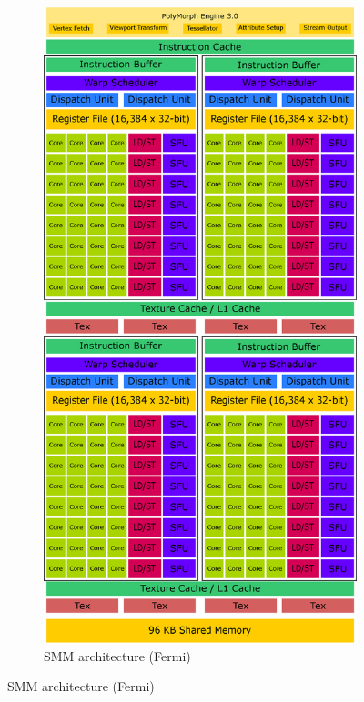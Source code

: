 \begin{figure}[p]
\begin{subfigure}{0.5\textwidth}
  \includegraphics[width=1\linewidth]{img/SMMArchitecture.eps}
  \caption{SMM architecture (Fermi)}
  \label{fig:smmarchitecture}
\end{subfigure}%
\vspace*{0.1cm} 

\end{figure}
